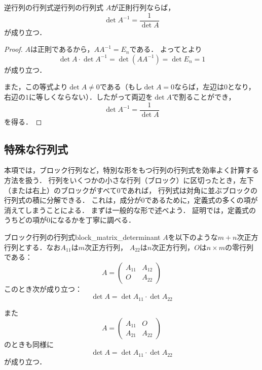 \begin{cor}{逆行列の行列式}{逆行列の行列式}
  $A$が正則行列ならば，
  \[
    \det A^{-1} = \frac{1}{\det A}
  \]
  が成り立つ．
\end{cor}

\begin{tleftbar}
\begin{proof}
  $A$は正則であるから，$AA^{-1}=E_n$である．
  よってとより
  \[
    \det A \cdot \det A^{-1}
    = \det(AA^{-1})
    = \det E_n
    = 1
  \]
  が成り立つ．

  また，この等式より$\det A \ne 0$である（もし$\det A = 0$ならば，左辺は$0$となり，右辺の$1$に等しくならない）．したがって両辺を$\det A$で割ることができ，
  \[
    \det A^{-1} = \frac{1}{\det A}
  \]
  を得る．
\end{proof}
\end{tleftbar}

\subsection{特殊な行列式}

本項では，ブロック行列など，特別な形をもつ行列の行列式を効率よく計算する方法を扱う．
行列をいくつかの小さな行列（ブロック）に区切ったとき，左下（または右上）のブロックがすべて$0$であれば，
行列式は対角に並ぶブロックの行列式の積に分解できる．
これは，成分が$0$であるために，定義式の多くの項が消えてしまうことによる．
まずは一般的な形で述べよう．
証明では，定義式のうちどの項が$0$になるかを丁寧に調べる．


\begin{prop}{ブロック行列の行列式}{block_matrix_determinant}
  $A$を以下のような$m+n$次正方行列とする．なお$A_{11}$は$m$次正方行列，
  $A_{22}$は$n$次正方行列，$O$は$n \times m$の零行列である：
  \[
    A=
    \begin{pmatrix}
      A_{11} & A_{12} \\
      O & A_{22}
    \end{pmatrix}
  \]
  このとき次が成り立つ：
  \[
    \det A = \det A_{11} \cdot \det A_{22}
  \]

  また
  \[
  A = \begin{pmatrix}
    A_{11} & O \\
    A_{21} & A_{22}
  \end{pmatrix}
  \]
  のときも同様に
  \[
    \det A = \det A_{11} \cdot \det A_{22}
  \]  
が成り立つ．
\end{prop}

